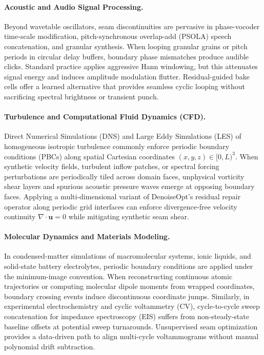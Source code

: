 \paragraph{Acoustic and Audio Signal Processing.}
Beyond wavetable oscillators, seam discontinuities are pervasive in phase-vocoder time-scale modification, pitch-synchronous overlap-add (PSOLA) speech concatenation, and granular synthesis.
When looping granular grains or pitch periods in circular delay buffers, boundary phase mismatches produce audible clicks.
Standard practice applies aggressive Hann windowing, but this attenuates signal energy and induces amplitude modulation flutter.
Residual-guided bake cells offer a learned alternative that provides seamless cyclic looping without sacrificing spectral brightness or transient punch.

\paragraph{Turbulence and Computational Fluid Dynamics (CFD).}
Direct Numerical Simulations (DNS) and Large Eddy Simulations (LES) of homogeneous isotropic turbulence commonly enforce periodic boundary conditions (PBCs) along spatial Cartesian coordinates $(x, y, z) \in [0, L)^3$.
When synthetic velocity fields, turbulent inflow patches, or spectral forcing perturbations are periodically tiled across domain faces, unphysical vorticity shear layers and spurious acoustic pressure waves emerge at opposing boundary faces.
Applying a multi-dimensional variant of DenoiseOpt's residual repair operator along periodic grid interfaces can enforce divergence-free velocity continuity $\nabla \cdot \mathbf{u} = 0$ while mitigating synthetic seam shear.

\paragraph{Molecular Dynamics and Materials Modeling.}
In condensed-matter simulations of macromolecular systems, ionic liquids, and solid-state battery electrolytes, periodic boundary conditions are applied under the minimum-image convention.
When reconstructing continuous atomic trajectories or computing molecular dipole moments from wrapped coordinates, boundary crossing events induce discontinuous coordinate jumps.
Similarly, in experimental electrochemistry and cyclic voltammetry (CV), cycle-to-cycle sweep concatenation for impedance spectroscopy (EIS) suffers from non-steady-state baseline offsets at potential sweep turnarounds.
Unsupervised seam optimization provides a data-driven path to align multi-cycle voltammograms without manual polynomial drift subtraction.


